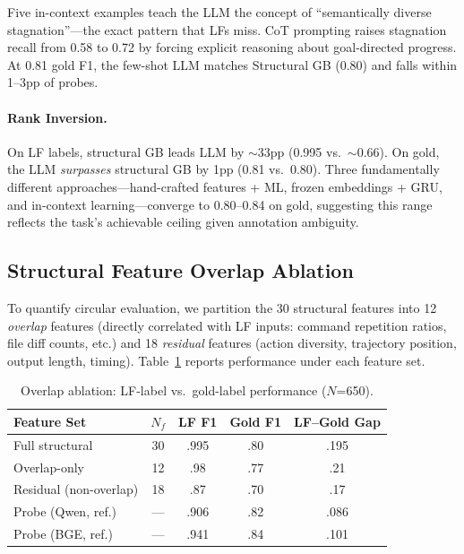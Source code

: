 \documentclass[11pt,a4paper]{article}
\begin{document}
Five in-context examples teach the LLM the concept of ``semantically diverse stagnation''---the exact pattern that LFs miss.
CoT prompting raises stagnation recall from 0.58 to 0.72 by forcing explicit reasoning about goal-directed progress.
At 0.81 gold F1, the few-shot LLM matches Structural GB (0.80) and falls within 1--3pp of probes.

\paragraph{Rank Inversion.}
On LF labels, structural GB leads LLM by $\sim$33pp (0.995 vs.\ $\sim$0.66).
On gold, the LLM \emph{surpasses} structural GB by 1pp (0.81 vs.\ 0.80).
Three fundamentally different approaches---hand-crafted features + ML, frozen embeddings + GRU, and in-context learning---converge to 0.80--0.84 on gold, suggesting this range reflects the task's achievable ceiling given annotation ambiguity.

\subsection{Structural Feature Overlap Ablation}
\label{sec:overlap}

To quantify circular evaluation, we partition the 30 structural features into 12 \emph{overlap} features (directly correlated with LF inputs: command repetition ratios, file diff counts, etc.) and 18 \emph{residual} features (action diversity, trajectory position, output length, timing).
Table~\ref{tab:overlap} reports performance under each feature set.

\begin{table}[t]
\centering
\small
\caption{Overlap ablation: LF-label vs.\ gold-label performance ($N$=650).}
\label{tab:overlap}
\begin{tabular}{lcccc}
\toprule
\textbf{Feature Set} & \textbf{$N_f$} & \textbf{LF F1} & \textbf{Gold F1} & \textbf{LF--Gold Gap} \\
\midrule
Full structural     & 30 & .995 & .80 & .195 \\
Overlap-only        & 12 & .98  & .77 & .21  \\
Residual (non-overlap) & 18 & .87  & .70 & .17  \\
\midrule
Probe (Qwen, ref.)  & --- & .906 & .82 & .086 \\
Probe (BGE, ref.)   & --- & .941 & .84 & .101 \\
\bottomrule
\end{tabular}
\end{table}
\end{document}
